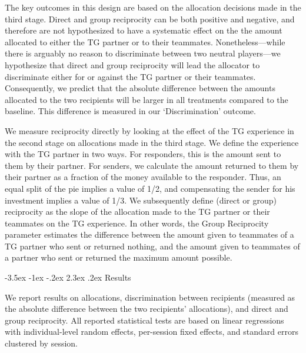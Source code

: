 \documentclass[12pt,a4paper]{article}\usepackage[]{graphicx}\usepackage[]{color}
\makeatletter
\renewcommand\section{\@startsection {section}{1}{\z@}%
{-3.5ex \@plus -1ex \@minus -.2ex}%
{2.3ex \@plus.2ex}%
{\bf\sffamily\Large}}
\makeatother
\begin{document}
The key outcomes in this design are based on the allocation decisions made in the third stage. Direct and group reciprocity can be both positive and negative, and therefore are not hypothesized to have a systematic effect on the the amount allocated to either the TG partner or to their teammates. Nonetheless---while there is arguably no reason to discriminate between two neutral players---we hypothesize that direct and group reciprocity will lead the allocator to discriminate either for or against the TG partner or their teammates. Consequently, we predict that the absolute difference between the amounts allocated to the two recipients will be larger in all treatments compared to the baseline. This difference is measured in our `Discrimination' outcome.

We measure reciprocity directly by looking at the effect of the TG experience in the second stage on allocations made in the third stage. We define the experience with the TG partner in two ways. For responders, this is the amount sent to them by their partner. For senders, we calculate the amount returned to them by their partner as a fraction of the money available to the responder. Thus, an equal split of the pie implies a value of 1/2, and compensating the sender for his investment implies a value of 1/3. We subsequently define (direct or group) reciprocity as the slope of the allocation made to the TG partner or their teammates on the TG experience. In other words, the Group Reciprocity parameter estimates the difference between the amount given to teammates of a TG partner who sent or returned nothing, and the amount given to teammates of a partner who sent or returned the maximum amount possible.

\section{Results}
\label{sec:results}

We report results on allocations, discrimination between recipients (measured as the
absolute difference between the two recipients' allocations), and direct and
group reciprocity. All reported statistical tests are based on linear
regressions with individual-level random effects, per-session fixed effects, and standard errors 
clustered by session. %
\end{document}
